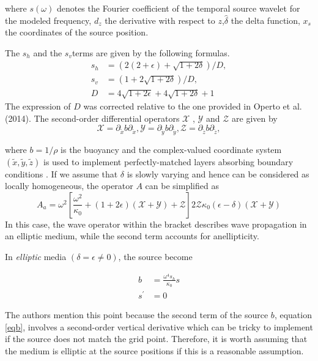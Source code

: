 where $s(\omega)$ denotes the Fourier coefficient of the temporal source wavelet for the modeled frequency, $d_z$ the derivative with respect to $z$,$\hat{\delta}$ the delta function, $x_s$ the coordinates of the source position. 

The $s_h$ and the $s_v$terms are given by the following formulas.
\begin{align}
s_h &= (2(2+\epsilon)+ \sqrt{1+2\delta})/D, \\
s_v &= (1+2\sqrt{1+2\delta})/D, \\
D &=  4\sqrt{1+2\epsilon} + 4 \sqrt{1+2\delta} + 1
\end{align}
The expression of $ D $ was corrected relative to the one provided in Operto et al. (2014). \newline
The second-order differential operators $  \mathcal{X}$ , $ \mathcal{Y}$ and $ \mathcal{Z}$ are given by
$$ \mathcal{X} = \partial_{\tilde{x}} b  \partial_{\tilde{x}},  \mathcal{Y} = \partial_{\tilde{y}} b  \partial_{\tilde{y}},  \mathcal{Z} = \partial_{\tilde{z}} b  \partial_{\tilde{z}},  $$

where $b=1/\rho$ is the buoyancy and the complex-valued coordinate system $(\tilde{x}, \tilde{y}, \tilde{z})$ is used to implement perfectly-matched layers absorbing boundary conditions \cite{Operto2007}.
If we assume that $\delta$ is slowly varying and hence can be considered as locally homogeneous, the operator $ A $ can be simplified as
\begin{equation}
A_{a} = \omega^{2} \left[ \frac{\omega^{2}}{\kappa_{0}} + (1+2 \epsilon) (\mathcal{X} + \mathcal{Y}) + \mathcal{Z} \right] 2 \mathcal{Z}\kappa_{0} (\epsilon - \delta)  (\mathcal{X} + \mathcal{Y}) \label{eq13}
\end{equation}
In this case, the wave operator within the bracket describes wave propagation in an elliptic medium,
while the second term accounts for anellipticity.

In \textit{elliptic} media $ (\delta=\epsilon \neq 0 ) $, the source become

\begin{align}
b &= \frac{\omega^{4} s_h}{\kappa_{0}} s \\
s^{'} &= 0
\end{align}

The authors mention  this point because the second term of the source $b$, equation \ref{eqb}, involves a second-order vertical derivative which can be tricky to implement if the source does not match the grid point. Therefore, it is worth assuming that the medium is elliptic at the source positions if this is a reasonable assumption.

